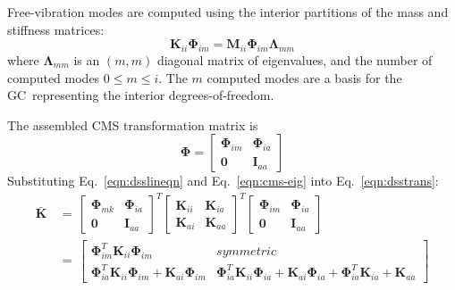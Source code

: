 \documentclass[10pt,openany,twoside]{book}
\numberwithin{equation}{section}   %
\newcommand{\Matrix}[1]{\boldsymbol{#1}}
\newcommand{\Gc}{GC}
\newcommand{\Eqn}[1]{Eq.\ \ref{#1}}
\begin{document}
Free-vibration modes are computed using the interior
partitions of the mass and stiffness matrices:
\begin{equation}\label{eqn:cms-eig}
\Matrix{K}_{ii} \Matrix{\Phi}_{im} = \Matrix{M}_{ii} \Matrix{\Phi}_{im} \Matrix{\Lambda}_{mm}
\end{equation}
where $\Matrix{\Lambda}_{mm}$ is an $(m,m)$ diagonal matrix
of eigenvalues, and the number of computed modes $0 \leq m \leq i$.
The $m$ computed modes are a basis for the \Gc\ representing the interior degrees-of-freedom.

The assembled CMS transformation matrix is
\begin{equation}
\Matrix{\Phi} = \left[
\begin{array}{cc}
   \Matrix{\Phi}_{im} & \Matrix{\Phi}_{ia} \\
   \Matrix{0} & \Matrix{I}_{aa}
\end{array}
\right]			\nonumber
\end{equation}
Substituting \Eqn{eqn:dsslineqn} and \Eqn{eqn:cms-eig} into \Eqn{eqn:dsstrans}:
\begin{equation}
\begin{split}
\Matrix{\bar{K}} & \, = \, \left[
        \begin{array}{cc}
                \Matrix{\Phi}_{mk} & \Matrix{\Phi}_{ia} \\
                \Matrix{0} & \Matrix{I}_{aa}
        \end{array}
        \right]^T \left[
        \begin{array}{cc}
                \Matrix{K}_{ii} & \Matrix{K}_{ia} \\
                \Matrix{K}_{ai} & \Matrix{K}_{aa}
        \end{array}
        \right]^T \left[
        \begin{array}{cc}
                \Matrix{\Phi}_{im} & \Matrix{\Phi}_{ia} \\
                \Matrix{0} & \Matrix{I}_{aa}
        \end{array}
        \right]                                 \\
 & \, = \, \left[
\begin{array}{cc}
   \Matrix{\Phi}_{im}^T \Matrix{K}_{ii} \Matrix{\Phi}_{im} & symmetric \\
   \Matrix{\Phi}_{ia}^T \Matrix{K}_{ii} \Matrix{\Phi}_{im} + \Matrix{K}_{ai} \Matrix{\Phi}_{im} &
                        \Matrix{\Phi}_{ia}^T \Matrix{K}_{ii} \Matrix{\Phi}_{ia} +
                        \Matrix{K}_{ai} \Matrix{\Phi}_{ia} + \Matrix{\Phi}_{ia}^T \Matrix{K}_{ia} + \Matrix{K}_{aa}
\end{array}
\right]
\end{split}		\nonumber
\end{equation}
\end{document}
